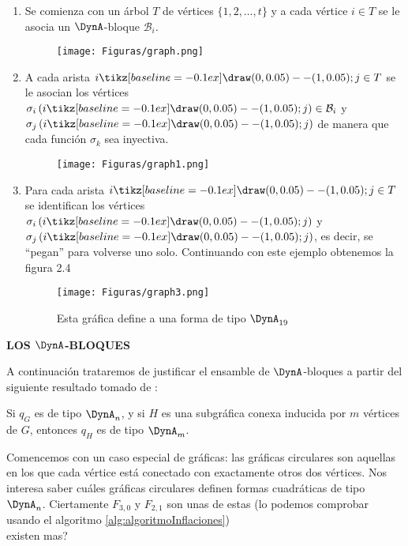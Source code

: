 \begin{enumerate}
\item Se comienza con un árbol $T$ de vértices $\{1, 2, \ldots, t\}$ y a cada vértice $i \in T$ se le asocia un $\DynA$-bloque $\mathcal{B}_{i}$.
 \begin{figure}[H]
    \centering%
    \texttt{[image: Figuras/graph.png]}
\end{figure}
\item A cada arista $i \tikz[baseline=-0.1ex]\draw (0,0.05) -- (1,0.05); j \in T$ se le asocian los vértices $\sigma_{i}\left(i \tikz[baseline=-0.1ex]\draw (0,0.05) -- (1,0.05); j\right) \in \mathcal{B}_{i}$ y $\sigma_{j}\left(i \tikz[baseline=-0.1ex]\draw (0,0.05) -- (1,0.05); j \right)$ de manera que cada función $\sigma_{k}$ sea inyectiva.
 \begin{figure}[H]
    \centering%
    \texttt{[image: Figuras/graph1.png]}
\end{figure}
\item Para cada arista $i \tikz[baseline=-0.1ex]\draw (0,0.05) -- (1,0.05); j \in T$ se identifican los vértices $\sigma_{i}\left(i \tikz[baseline=-0.1ex]\draw (0,0.05) -- (1,0.05); j\right)$ y $\sigma_{j}\left(i \tikz[baseline=-0.1ex]\draw (0,0.05) -- (1,0.05); j\right)$, es decir, se “pegan” para volverse uno solo. Continuando con este ejemplo obtenemos la figura 2.4
 \begin{figure}[H]
    \centering%
    \texttt{[image: Figuras/graph3.png]}
     \caption{Esta gráfica define a una forma de tipo $\DynA_{19}$}
    \label{figura:2.4}
\end{figure}
\end{enumerate}

\textbf{LOS $\DynA$-BLOQUES}

A continuación trataremos de justificar el ensamble de $\DynA$-bloques a partir del siguiente resultado tomado de \citep{article123}:
\begin{theorem}
Si $q_{G}$ es de tipo $\DynA_{n}$, y si $H$ es una subgráfica conexa inducida por $m$ vértices de $G$, entonces $q_{H}$ es de tipo $\DynA_{m}$.
\label{teorema:2.5}
\end{theorem}
Comencemos con un caso especial de gráficas: las gráficas circulares son aquellas en los que cada vértice está conectado con exactamente otros dos vértices. Nos interesa saber cuáles gráficas circulares definen formas cuadráticas de tipo $\DynA_{n}$. Ciertamente $F_{3,0}$ y $F_{2,1}$ son unas de estas (lo podemos comprobar usando el algoritmo \ref{alg:algoritmoInflaciones})\\
\textquestiondown existen mas?\\

